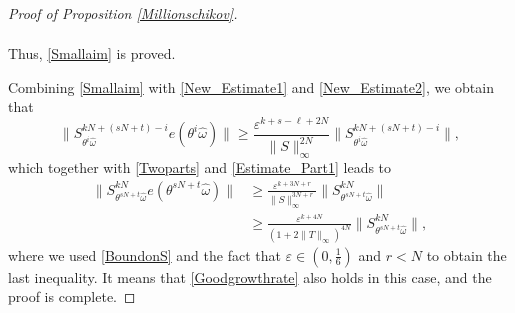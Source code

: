 \documentclass[pdflatex,sn-mathphys-num]{sn-jnl}%
\theoremstyle{thmstyleone}%
\theoremstyle{thmstyletwo}%
\theoremstyle{thmstylethree}%
\newcommand{\eps}{\varepsilon}
\numberwithin{equation}{section}
\begin{document}
\begin{proof}[Proof of Proposition \ref{Millionschikov}]
\begin{itemize}
\begin{align*}
    \end{align*}
Thus, \eqref{Smallaim} is proved.
\end{itemize}
Combining \eqref{Smallaim} with \eqref{New_Estimate1} and \eqref{New_Estimate2}, we obtain that 
\[
\|S^{kN+(sN+t)-i}_{\theta^{i}\widehat\omega}e(\theta^{i}\widehat\omega)\|
\geq 
       \frac{\eps^{k+s-\ell+2N}}{\|S\|_{\infty}^{2N}} \|S^{kN+(sN+t)-i}_{\theta^{i}\widehat\omega}\|,
\]
which together with \eqref{Twoparts} and \eqref{Estimate_Part1} leads to
\begin{align*}
\|S^{kN}_{\theta^{sN+t}\widehat\omega}e(\theta^{sN+t}\widehat\omega)\|
& \geq \frac{\eps^{k+3N+r}}{\|S\|_{\infty}^{3N+r}}\|S^{kN}_{\theta^{sN+t}\widehat\omega}\|\\[1ex]
&\geq 
\frac{\eps^{k+4N}}{(1+2\|T\|_{\infty})^{4N}} \|S^{kN}_{\theta^{sN+t}\widehat\omega}\|,
\end{align*}
where we used \eqref{BoundonS} and the fact that $\eps\in (0,\frac{1}{6})$ and $r<N$ to obtain the last inequality. It means that \eqref{Goodgrowthrate} also holds in this case, and the proof is complete.
\end{proof}
\end{document}
